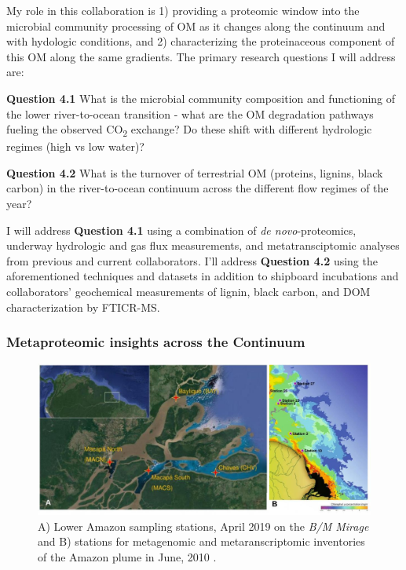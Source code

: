 \documentclass[12pt, letterpaper, twoside]{article}
\begin{document}
My role in this collaboration is 1) providing a proteomic window into the microbial community processing of OM as it changes along the continuum and with hydologic conditions, and 2) characterizing the proteinaceous component of this OM along the same gradients. The primary research questions I will address are:

\bigskip

\textbf{Question 4.1} What is the microbial community composition and functioning of the lower river-to-ocean transition - what are the OM degradation pathways fueling the observed CO\textsubscript{2} exchange? Do these shift with different hydrologic regimes (high vs low water)?

\bigskip

\textbf{Question 4.2} What is the turnover of terrestrial OM (proteins, lignins, black carbon) in the river-to-ocean continuum across the different flow regimes of the year? 

\bigskip

I will address \textbf{Question 4.1} using a combination of \textit{de novo}-proteomics, underway hydrologic and gas flux measurements, and metatransciptomic analyses from previous \cite{doherty_bacterial_2017, satinsky_amazon_2014} and current collaborators. I'll address \textbf{Question 4.2} using the aforementioned techniques and datasets in addition to shipboard incubations and collaborators' geochemical measurements of lignin, black carbon, and DOM characterization by FTICR-MS.

\subsubsection{Metaproteomic insights across the Continuum}

\begin{figure}
	\includegraphics[width=\linewidth]{amazon-sta-map.jpg}
	\caption{A) Lower Amazon sampling stations, April 2019 on the \textit{B/M Mirage} and B) stations for metagenomic and metaranscriptomic inventories of the Amazon plume in June, 2010 \cite{satinsky_amazon_2014}.}
	\label{fig:amazon-stations}
\end{figure}
\end{document}

